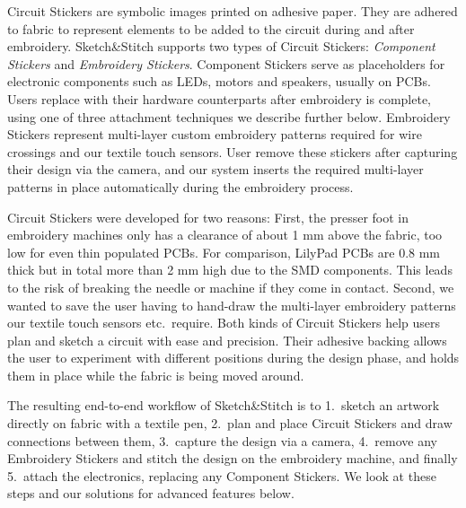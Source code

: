\documentclass[header.tex]{subfiles}
\begin{document}
Circuit Stickers are symbolic images printed on adhesive paper. 
They are adhered to fabric to represent elements to be added to the circuit during and after embroidery. Sketch\&Stitch supports two types of Circuit Stickers: \textit{Component Stickers} and \textit{Embroidery Stickers}. Component Stickers serve as placeholders for electronic components such as LEDs, motors and speakers, usually on PCBs. Users replace with their hardware counterparts after embroidery is complete, using one of three attachment techniques we describe further below. Embroidery Stickers represent multi-layer custom embroidery patterns required for wire crossings and our textile touch sensors. User remove these stickers after capturing their design via the camera, and our system inserts the required multi-layer patterns in place automatically during the embroidery process.

Circuit Stickers were developed for two reasons: First, the presser foot in embroidery machines only has a clearance of about 1 mm above the fabric, too low for even thin populated PCBs. For comparison, LilyPad PCBs are 0.8 mm thick but in total more than 2 mm high due to the SMD components. This leads to the risk of breaking the needle or machine if they come in contact. Second, we wanted to save the user having to hand-draw the multi-layer embroidery patterns our textile touch sensors etc.\ require. Both kinds of Circuit Stickers help users plan and sketch a circuit with ease and precision. Their adhesive backing allows the user to experiment with different positions  during the design phase, and holds them in place while the fabric is being moved around.


The resulting end-to-end workflow of Sketch\&Stitch is to 1.\ sketch an artwork directly on fabric with a textile pen, 2.\ plan and place Circuit Stickers and draw connections between them, 3.\ capture the design via a camera, 4.\ remove any Embroidery Stickers and stitch the design on the embroidery machine, and finally 5.\ attach the electronics, replacing any Component Stickers. We look at these steps and our solutions for advanced features below.

\end{document}
